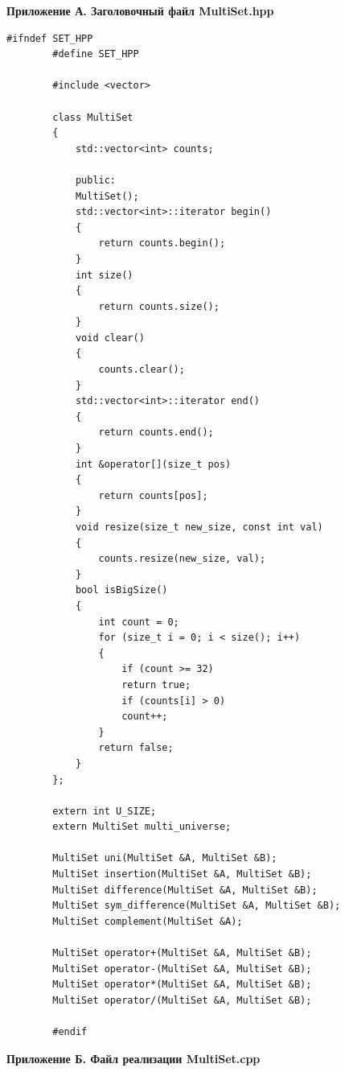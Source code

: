 \documentclass[14pt, a4paper]{extarticle}
\begin{document}
	\clearpage
	\begin{flushleft}
		{\bf Приложение А. Заголовочный файл MultiSet.hpp}
	\end{flushleft}
	\label{appendix:A}
	
	\begin{lstlisting}[caption={Заголовочный файл MultiSet.hpp}, label={lst:multiset_hpp}]
		#ifndef SET_HPP
		#define SET_HPP
		
		#include <vector>
		
		class MultiSet
		{
			std::vector<int> counts;
			
			public:
			MultiSet();
			std::vector<int>::iterator begin()
			{
				return counts.begin();
			}
			int size()
			{
				return counts.size();
			}
			void clear()
			{
				counts.clear();
			}
			std::vector<int>::iterator end()
			{
				return counts.end();
			}
			int &operator[](size_t pos)
			{
				return counts[pos];
			}
			void resize(size_t new_size, const int val)
			{
				counts.resize(new_size, val);
			}
			bool isBigSize()
			{
				int count = 0;
				for (size_t i = 0; i < size(); i++)
				{
					if (count >= 32)
					return true;
					if (counts[i] > 0)
					count++;
				}
				return false;
			}
		};
		
		extern int U_SIZE;
		extern MultiSet multi_universe;
		
		MultiSet uni(MultiSet &A, MultiSet &B);
		MultiSet insertion(MultiSet &A, MultiSet &B);
		MultiSet difference(MultiSet &A, MultiSet &B);
		MultiSet sym_difference(MultiSet &A, MultiSet &B);
		MultiSet complement(MultiSet &A);
		
		MultiSet operator+(MultiSet &A, MultiSet &B);
		MultiSet operator-(MultiSet &A, MultiSet &B);
		MultiSet operator*(MultiSet &A, MultiSet &B);
		MultiSet operator/(MultiSet &A, MultiSet &B);
		
		#endif
	\end{lstlisting}
	
	\clearpage
	\begin{flushleft}
		{\bf Приложение Б. Файл реализации MultiSet.cpp}
	\end{flushleft}
	\label{appendix:B}
	
\end{document}
